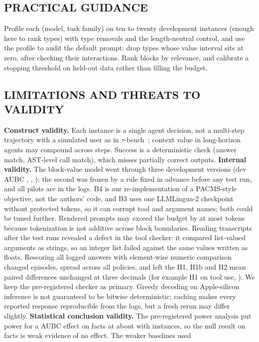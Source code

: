 \subsection{PRACTICAL GUIDANCE}
Profile each (model, task family) on ten to twenty development instances (enough here to rank types) with type removals
and the length-neutral control, and use the profile to audit the default prompt: drop types whose value interval sits at
zero, after checking their interactions. Rank blocks by relevance, and calibrate a stopping threshold on held-out data
rather than filling the budget.

\subsection{LIMITATIONS AND THREATS TO VALIDITY}
\textbf{Construct validity.} Each instance is a single agent decision, not a multi-step trajectory with a simulated
user as in $\tau$-bench~\cite{taubench2024}; context value in long-horizon agents may compound across steps. Success is a deterministic check (answer match, AST-level call match),
which misses partially correct outputs.
\textbf{Internal validity.} The block-value model went through three development versions (dev AUBC \RDevAubcOne,
\RDevAubcTwo, \RDevAubcThree); the second was frozen by a rule fixed in advance before any test run, and all pilots are in
the logs. B4 is our re-implementation of a PACMS-style objective, not the authors' code, and B3 uses one
LLMLingua-2 checkpoint without protected tokens, so it can corrupt tool and argument names; both could be tuned further. Rendered prompts may exceed the budget by at most \RMaxOvershoot
tokens because tokenization is not additive across block boundaries. Reading transcripts after the test runs revealed a defect in the tool checker: it compared list-valued arguments as
strings, so an integer list failed against the same values written as floats. Rescoring all logged answers with
element-wise numeric comparison changed \RCheckerFlips episodes, spread across all policies, and left the H1, H1b and H2
mean paired differences unchanged at three decimals (for example H1 on tool use, \RSensHOneTool). We keep the
pre-registered checker as primary. Greedy decoding on Apple-silicon inference is not
guaranteed to be bitwise deterministic; caching makes every reported response reproducible from the logs, but a fresh
rerun may differ slightly.
\textbf{Statistical conclusion validity.} The pre-registered power analysis put power for a \RSesoi{} AUBC effect on facts at
about \RPowerFacts with \RNMain instances, so the null result on facts is weak evidence of no effect. The weaker baselines used
